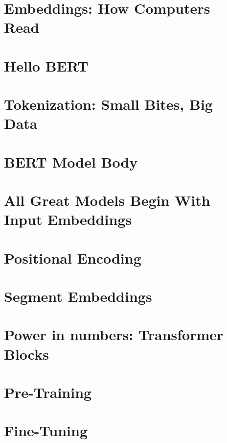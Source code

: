 
\section{Embeddings: How Computers Read}



\section{Hello BERT}



\section{Tokenization: Small Bites, Big Data}



\section{BERT Model Body}



\section{All Great Models Begin With Input Embeddings}



\section{Positional Encoding}


\section{Segment Embeddings}


\section{Power in numbers: Transformer Blocks}



\section{Pre-Training}



\section{Fine-Tuning}



%